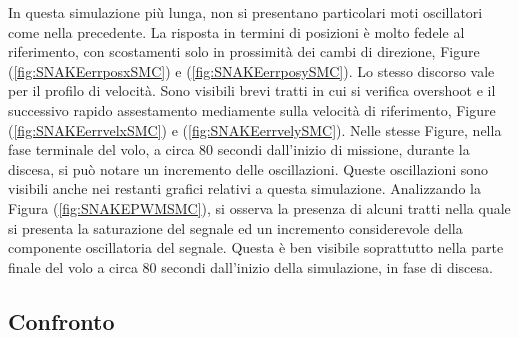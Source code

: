 In questa simulazione più lunga, non si presentano particolari moti oscillatori come nella precedente. La risposta in termini di posizioni è molto fedele al riferimento, con scostamenti solo in prossimità dei cambi di direzione, Figure (\ref{fig:SNAKEerrposxSMC}) e (\ref{fig:SNAKEerrposySMC}). Lo stesso discorso vale per il profilo di velocità. Sono visibili brevi tratti in cui si verifica overshoot e il successivo rapido assestamento mediamente sulla velocità di riferimento, Figure (\ref{fig:SNAKEerrvelxSMC}) e (\ref{fig:SNAKEerrvelySMC}). Nelle stesse Figure, nella fase terminale del volo, a circa 80 secondi dall'inizio di missione, durante la discesa, si può notare un incremento delle oscillazioni. Queste oscillazioni sono visibili anche nei restanti grafici relativi a questa simulazione. Analizzando la Figura (\ref{fig:SNAKEPWMSMC}), si osserva la presenza di alcuni tratti nella quale si presenta la saturazione del segnale ed un incremento considerevole della componente oscillatoria del segnale. Questa è ben visibile soprattutto nella parte finale del volo a circa 80 secondi dall'inizio della simulazione, in fase di discesa.

\subsection{Confronto}

